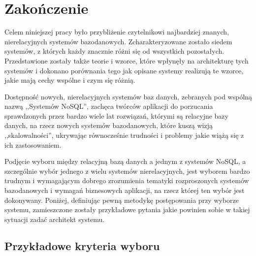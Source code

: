 \chapter{Zakończenie}

Celem niniejszej pracy było przybliżenie czytelnikowi najbardziej znanych, nierelacyjnych systemów bazodanowych.
Zcharakteryzowane zostało siedem systemów, z których każdy znacznie różni się od wszystkich pozostałych.
Przedstawione zostały także teorie i wzorce, które wpłynęły na architekturę tych systemów i dokonano porównania tego jak opisane systemy realizują te wzorce, jakie mają cechy wspólne i czym się różnią.

Dostępność nowych, nierelacyjnych systemów baz danych, zebranych pod wspólną nazwą ,,Systemów NoSQL'', zachęca twórców aplikacji do porzucania sprawdzonych przez bardzo wiele lat rozwiązań, którymi są relacyjne bazy danych, na rzecz nowych systemów bazodanowych, które kuszą wizją ,,skalowalności'', ukrywając równocześnie trudności i problemy jakie wiążą się z ich zastosowaniem.

Podjęcie wyboru między relacyjną bazą danych a jednym z systemów NoSQL, a szczególnie wybór jednego z wielu systemów nierelacyjnych, jest wyborem bardzo trudnym i wymagającym dobrego zrozumienia tematyki rozproszonych systemów bazodanowych i wymagań biznesowych aplikacji, na rzecz której ten wybór jest dokonywany.
Poniżej, definiując pewną metodykę postępowania przy wyborze systemu, zamieszczone zostały przykładowe pytania jakie powinien sobie w takiej sytuacji zadać architekt systemu. 

\section*{Przykładowe kryteria wyboru}

